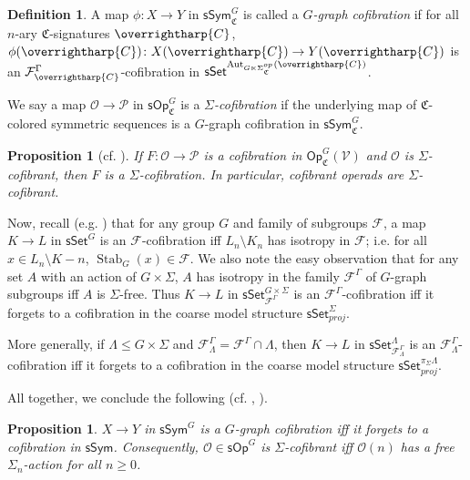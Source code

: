 \documentclass[a4paper,10pt
,draft
]{article}%
\numberwithin{equation}{section}
\numberwithin{figure}{section}
\newtheorem{proposition}[equation]{Proposition}%
\theoremstyle{definition} %
\newtheorem{definition}[equation]{Definition}%
\newcommand{\vect}[1]{\text{\overrightharp{\ensuremath{#1}}}}
\newcommand{\Sym}{\ensuremath{\mathsf{Sym}}}%
\newcommand{\sSet}{\ensuremath{\mathsf{sSet}}}%
\newcommand{\Op}{\mathsf{Op}}%
\newcommand{\sOp}{\ensuremath{\mathsf{sOp}}}%
\newcommand{\sSym}{\ensuremath{\mathsf{sSym}}}%
\DeclareMathOperator{\Aut}{Aut}%
\DeclareMathOperator{\Stab}{Stab}
\newcommand{\F}{\ensuremath{\mathcal F}}
\newcommand{\V}{\ensuremath{\mathcal V}}
\renewcommand{\O}{\ensuremath{\mathcal O}}
\renewcommand{\P}{\ensuremath{\mathcal P}}
\newcommand{\1}{\ensuremath{\mathbbm 1}}%
\begin{document}
\begin{definition}
      A map $\phi \colon X \to Y$ in $\sSym^G_{\mathfrak C}$ is called a \textit{$G$-graph cofibration} if
      for all $n$-ary $\mathfrak C$-signatures $\vect C$,
      $\phi(\vect C) \colon X(\vect C) \to Y(\vect C)$ is an $\F^\Gamma_{\vect C}$-cofibration in $\sSet^{\Aut_{G \ltimes \Sigma_{\mathfrak C}^{op}}(\vect C)}$.
      
      We say a map $\O \to \P$ in $\sOp^G_{\mathfrak C}$ is a \textit{$\Sigma$-cofibration}
      if the underlying map of $\mathfrak C$-colored symmetric sequences is a $G$-graph cofibration in $\sSym_{\mathfrak C}^G$. 
\end{definition}

\begin{proposition}[{cf. \cite[Prop. 3.63]{BP_HGOP}}]
      \label{SIGMAG_COF PROP}
      If $F \colon \O \to \P$ is a cofibration in $\Op^G_{\mathfrak C}(\V)$ and $\O$ is $\Sigma$-cofibrant,
      then $F$ is a $\Sigma$-cofibration.
      In particular, cofibrant operads are $\Sigma$-cofibrant.
\end{proposition}

Now, recall (e.g. \cite[Prop. 2.16]{Ste16}) that for any group $G$ and family of subgroups $\F$,
a map $K \to L$ in $\sSet^{G}$ is an $\F$-cofibration iff $L_n \setminus K_n$ has isotropy in $\F$; i.e. for all $x \in L_n \setminus K-n$, $\Stab_{G}(x) \in \F$. 
% 
We also note the easy observation that for any set $A$ with an action of $G \times \Sigma$,
$A$ has isotropy in the family $\F^\Gamma$ of $G$-graph subgroups
iff
$A$ is $\Sigma$-free.
% 
Thus $K \to L$ in $\sSet^{G \times \Sigma}_{\F^\Gamma}$ is an $\F^\Gamma$-cofibration
iff
it forgets to a cofibration in the coarse model structure $\sSet^\Sigma_{proj}$.

More generally, if $\Lambda \leq G \times \Sigma$ and $\F^\Gamma_{\Lambda} = \F^\Gamma \cap \Lambda$,
then $K \to L$ in $\sSet^{\Lambda}_{\F^\Gamma_\Lambda}$ is an $\F^\Gamma_\Lambda$-cofibration
iff
it forgets to a cofibration in the coarse model structure $\sSet^{\pi_{\Sigma}\Lambda}_{proj}$.
      
All together, we conclude the following (cf. \cite[Remark 6.7]{Per18}, \cite[discussion before Thm. 2.31]{BP_edss}).

\begin{proposition}
      \label{SGS_COF_PROP}
      $X \to Y$ in $\mathsf{sSym}^G$ is a $G$-graph cofibration iff
      it forgets to a cofibration in $\mathsf{sSym}$.
      Consequently, $\O \in \sOp^G$ is $\Sigma$-cofibrant iff $\O(n)$ has a free $\Sigma_n$-action for all $n \geq 0$.
\end{proposition}
\end{document}
